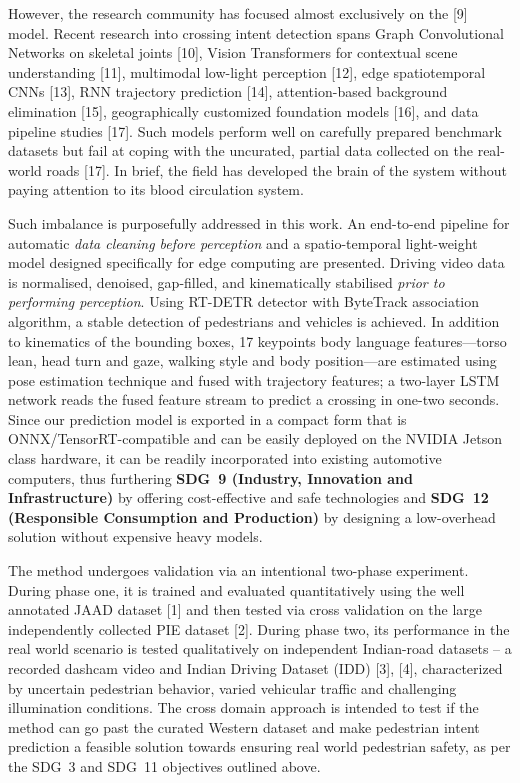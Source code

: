\documentclass[conference]{IEEEtran}
\begin{document}
However, the research community has focused almost exclusively on the [9] model. Recent research into crossing intent detection spans Graph Convolutional Networks on skeletal joints [10], Vision Transformers for contextual scene understanding [11], multimodal low-light perception [12], edge spatiotemporal CNNs [13], RNN trajectory prediction [14], attention-based background elimination [15], geographically customized foundation models [16], and data pipeline studies [17]. Such models perform well on carefully prepared benchmark datasets but fail at coping with the uncurated, partial data collected on the real-world roads [17]. In brief, the field has developed the brain of the system without paying attention to its blood circulation system.

Such imbalance is purposefully addressed in this work. An end-to-end pipeline for automatic \emph{data cleaning before perception} and a spatio-temporal light-weight model designed specifically for edge computing are presented. Driving video data is normalised, denoised, gap-filled, and kinematically stabilised \emph{prior to performing perception}. Using RT-DETR detector with ByteTrack association algorithm, a stable detection of pedestrians and vehicles is achieved. In addition to kinematics of the bounding boxes, 17 keypoints body language features---torso lean, head turn and gaze, walking style and body position---are estimated using pose estimation technique and fused with trajectory features; a two-layer LSTM network reads the fused feature stream to predict a crossing in one-two seconds. Since our prediction model is exported in a compact form that is ONNX/TensorRT-compatible and can be easily deployed on the NVIDIA Jetson class hardware, it can be readily incorporated into existing automotive computers, thus furthering \textbf{SDG~9 (Industry, Innovation and Infrastructure)} by offering cost-effective and safe technologies and \textbf{SDG~12 (Responsible Consumption and Production)} by designing a low-overhead solution without expensive heavy models.

The method undergoes validation via an intentional two-phase experiment. During phase one, it is trained and evaluated quantitatively using the well annotated JAAD dataset [1] and then tested via cross validation on the large independently collected PIE dataset [2]. During phase two, its performance in the real world scenario is tested qualitatively on independent Indian-road datasets – a recorded dashcam video and Indian Driving Dataset (IDD) [3], [4], characterized by uncertain pedestrian behavior, varied vehicular traffic and challenging illumination conditions. The cross domain approach is intended to test if the method can go past the curated Western dataset and make pedestrian intent prediction a feasible solution towards ensuring real world pedestrian safety, as per the SDG~3 and SDG~11 objectives outlined above.
\end{document}
